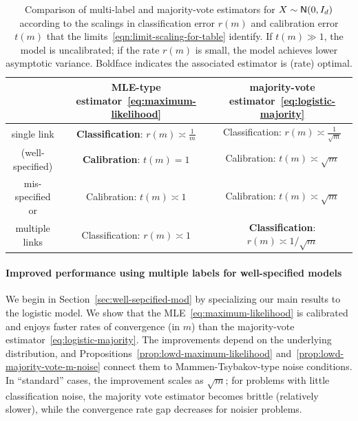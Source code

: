 \begin{table}
  \centering
  \begin{tabular}{c|c|c}
    \toprule 
    & MLE-type estimator~\eqref{eq:maximum-likelihood}
    & majority-vote estimator~\eqref{eq:logistic-majority} \\
    \hline
    single link
    & \textbf{Classification}:
    $r(m) \asymp \frac{1}{m}$
    & Classification: $r(m) \asymp \frac{1}{\sqrt{m}}$ \\
    (well-specified) & \textbf{Calibration}:
    $t(m) = 1$ &
    Calibration: $t(m) \asymp \sqrt{m}$ \\ 
    \hline
    mis-specified or
    & Calibration: $t(m) \asymp 1$ &  Calibration: $t(m) \asymp \sqrt{m}$  \\ 
    multiple links & Classification: $r(m) \asymp 1$ &
    \textbf{Classification}: $r(m) \asymp 1 / \sqrt{m}$
    \\
    \hline
  \end{tabular}
  \caption{
    Comparison of multi-label and majority-vote estimators
    for $X \sim \mathsf{N}(0, I_d)$
    according to the scalings in classification error
    $r(m)$ and calibration error $t(m)$ that
    the limits~\eqref{eqn:limit-scaling-for-table} identify.
    If $t(m) \gg 1$, the model is uncalibrated; if the rate $r(m)$ is small,
    the model achieves lower asymptotic variance.
    Boldface indicates the associated estimator
    is (rate) optimal. \label{table:comparisons}}
\end{table}


\paragraph{Improved performance using multiple labels for well-specified models}
We begin in Section~\ref{sec:well-sepcified-mod} by specializing our main
results to the logistic model.
%
We show that the MLE~\eqref{eq:maximum-likelihood} is
calibrated and enjoys faster rates of convergence (in $m$) than the
majority-vote estimator~\eqref{eq:logistic-majority}.
%
The improvements depend on the underlying distribution, and
Propositions~\ref{prop:lowd-maximum-likelihood}
and~\ref{prop:lowd-majority-vote-m-noise} connect them to
Mammen-Tsybakov-type noise conditions.
%
In ``standard'' cases, the improvement scales as
$\sqrt{m}$; for problems with little classification noise, the majority vote
estimator becomes brittle (relatively slower), while the convergence rate
gap decreases for noisier problems.


